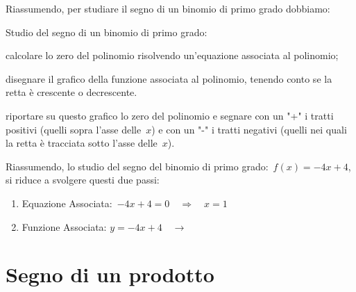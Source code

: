  \centering
 \begin{minipage}[]{.45\textwidth}
  \centering{}
 \end{minipage}
 \begin{minipage}[]{.45\textwidth}
  \centering{}
 \end{minipage}

Riassumendo, per studiare il segno di un binomio di primo grado dobbiamo: 

\begin{procedura}{}{}
 Studio del segno di un binomio di primo grado:
\begin{enumeratea}
\item calcolare lo zero del polinomio risolvendo un'equazione associata al 
 polinomio;
\item disegnare il grafico della funzione associata al polinomio, 
 tenendo conto se la retta è crescente o decrescente.
\item riportare su questo grafico lo zero del polinomio e segnare con un 
 "+" i tratti positivi (quelli sopra l'asse delle~\(x\)) e con un "-" i 
 tratti  negativi (quelli nei quali la retta è tracciata sotto l'asse 
delle~\(x\)).
\end{enumeratea}
\end{procedura}

Riassumendo, lo studio del segno del binomio di primo 
grado:~\(f(x) = -4 x +4\), si riduce a svolgere questi due passi:

\begin{enumerate}
 \item
  Equazione Associata:~\(-4 x +4 = 0 \quad \Rightarrow \quad x = 1\)
 \item 
  \begin{minipage}{.45\textwidth}
  Funzione Associata: \(y = -4 x +4 \quad \rightarrow\)
  \end{minipage}
  \begin{minipage}{.30\textwidth}
  \end{minipage}
\end{enumerate}

\section{Segno di un prodotto}
\label{sec:dis_prodotto}

